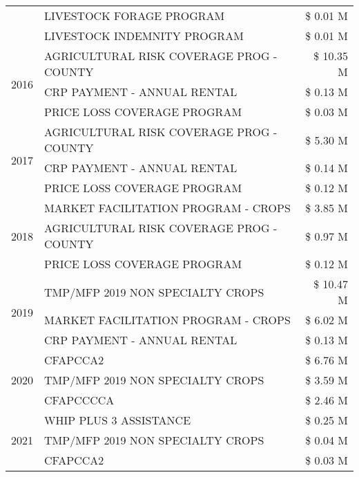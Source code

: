 \begin{tabular}{llr}
 & LIVESTOCK FORAGE PROGRAM & \$ 0.01 M \\
 & LIVESTOCK INDEMNITY PROGRAM & \$ 0.01 M \\
\cline{1-3}
\multirow[t]{3}{*}{2016} & AGRICULTURAL RISK COVERAGE PROG - COUNTY      & \$ 10.35 M \\
 & CRP PAYMENT - ANNUAL RENTAL                   & \$ 0.13 M \\
 & PRICE LOSS COVERAGE PROGRAM                   & \$ 0.03 M \\
\cline{1-3}
\multirow[t]{3}{*}{2017} & AGRICULTURAL RISK COVERAGE PROG - COUNTY & \$ 5.30 M \\
 & CRP PAYMENT - ANNUAL RENTAL & \$ 0.14 M \\
 & PRICE LOSS COVERAGE PROGRAM & \$ 0.12 M \\
\cline{1-3}
\multirow[t]{3}{*}{2018} & MARKET FACILITATION PROGRAM - CROPS & \$ 3.85 M \\
 & AGRICULTURAL RISK COVERAGE PROG - COUNTY & \$ 0.97 M \\
 & PRICE LOSS COVERAGE PROGRAM & \$ 0.12 M \\
\cline{1-3}
\multirow[t]{3}{*}{2019} & TMP/MFP 2019 NON SPECIALTY CROPS & \$ 10.47 M \\
 & MARKET FACILITATION PROGRAM - CROPS & \$ 6.02 M \\
 & CRP PAYMENT - ANNUAL RENTAL & \$ 0.13 M \\
\cline{1-3}
\multirow[t]{3}{*}{2020} & CFAPCCA2 & \$ 6.76 M \\
 & TMP/MFP 2019 NON SPECIALTY CROPS & \$ 3.59 M \\
 & CFAPCCCCA & \$ 2.46 M \\
\cline{1-3}
\multirow[t]{3}{*}{2021} & WHIP PLUS 3 ASSISTANCE & \$ 0.25 M \\
 & TMP/MFP 2019 NON SPECIALTY CROPS & \$ 0.04 M \\
 & CFAPCCA2 & \$ 0.03 M \\
\cline{1-3}
\bottomrule
\end{tabular}
